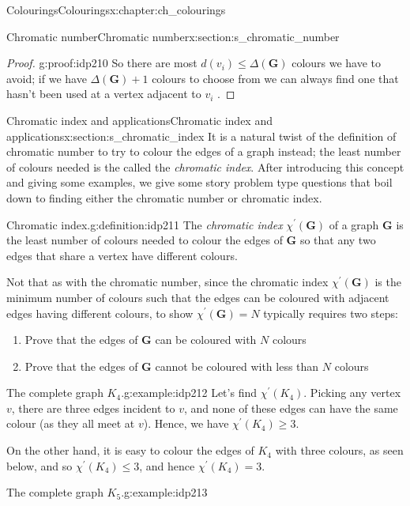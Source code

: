 \documentclass[oneside,10pt,]{book}
\numberwithin{equation}{section}
\newcommand{\bfG}{\mathbf{G}}
\begin{document}
\begin{chapterptx}{Colourings}{}{Colourings}{}{}{x:chapter:ch_colourings}
\begin{sectionptx}{Chromatic number}{}{Chromatic number}{}{}{x:section:s_chromatic_number}
\begin{proof}{}{g:proof:idp210}
So there are most \(d(v_i)\leq \Delta(\bfG)\) colours we have to avoid; if we have \(\Delta(\bfG)+1\) colours to choose from we can always find one that hasn't been used at a vertex adjacent to \(v_i\)%
.\end{proof}
\end{sectionptx}
%
%
\typeout{************************************************}
\typeout{************************************************}
%
\begin{sectionptx}{Chromatic index and applications}{}{Chromatic index and applications}{}{}{x:section:s_chromatic_index}
It is a natural twist of the definition of chromatic number to try to colour the edges of a graph instead; the least number of colours needed is the called the \emph{chromatic index}.  After introducing this concept and giving some examples, we give some story problem type questions that boil down to finding either the chromatic number or chromatic index.%
\begin{definition}{Chromatic index.}{g:definition:idp211}%
The \emph{chromatic index} \(\chi^\prime(\bfG)\) of a graph \(\bfG\) is the least number of colours needed to colour the edges of \(\bfG\) so that any two edges that share a vertex have different colours.%
\end{definition}
Not that as with the chromatic number, since the chromatic index \(\chi^\prime(\bfG)\) is the minimum number of colours such that the edges can be coloured with adjacent edges having different colours, to show \(\chi^\prime(\bfG)=N\) typically requires two steps:%
%
\begin{enumerate}
\item{}Prove that the edges of \(\bfG\) can be coloured with \(N\) colours%
\item{}Prove that the edges of \(\bfG\) cannot be coloured with less than \(N\) colours%
\end{enumerate}
\begin{example}{The complete graph \(K_4\).}{g:example:idp212}%
Let's find \(\chi^\prime(K_4)\).  Picking any vertex \(v\), there are three edges incident to \(v\), and none of these edges can have the same colour (as they all meet at \(v\)).  Hence, we have \(\chi^\prime(K_4)\geq 3\).%
\par
On the other hand, it is easy to colour the edges of \(K_4\) with three colours, as seen below, and so \(\chi^\prime(K_4)\leq 3\), and hence \(\chi^\prime(K_4)=3\).%
\end{example}
\begin{example}{The complete graph \(K_5\).}{g:example:idp213}%

\end{example}
\end{sectionptx}
\end{chapterptx}
\end{document}
